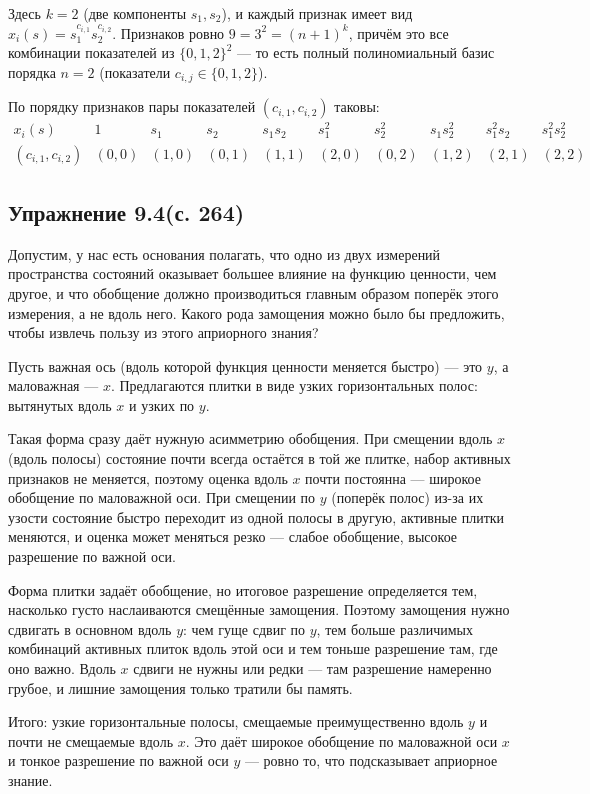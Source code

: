 \begin{solution}
    Здесь $k=2$ (две компоненты $s_1, s_2$), и каждый признак имеет вид
    $x_i(s) = s_1^{c_{i,1}} s_2^{c_{i,2}}$. Признаков ровно $9 = 3^2 = (n+1)^k$,
    причём это все комбинации показателей из $\{0,1,2\}^2$ --- то есть полный
    полиномиальный базис порядка $n=2$ (показатели $c_{i,j} \in \{0,1,2\}$).

    По порядку признаков пары показателей $(c_{i,1}, c_{i,2})$ таковы:
    \begin{equation*}
        \begin{array}{c|ccccccccc}
            x_i(s) & 1 & s_1 & s_2 & s_1 s_2 & s_1^2 & s_2^2 & s_1 s_2^2 & s_1^2 s_2 & s_1^2 s_2^2 \\
            \hline
            (c_{i,1}, c_{i,2}) & (0,0) & (1,0) & (0,1) & (1,1) & (2,0) & (0,2) & (1,2) & (2,1) & (2,2)
        \end{array}
    \end{equation*}
\end{solution}

\subsection{Упражнение 9.4(с. 264)}
Допустим, у нас есть основания полагать, что одно из двух измерений пространства состояний оказывает большее влияние на функцию ценности, чем другое, и что обобщение должно производиться главным образом поперёк этого измерения, а не вдоль него. Какого рода замощения можно было бы предложить, чтобы извлечь пользу из этого априорного знания?

\begin{solution}
    Пусть важная ось (вдоль которой функция ценности меняется быстро) --- это
    $y$, а маловажная --- $x$. Предлагаются плитки в виде узких горизонтальных
    полос: вытянутых вдоль $x$ и узких по $y$.

    Такая форма сразу даёт нужную асимметрию обобщения. При смещении вдоль $x$
    (вдоль полосы) состояние почти всегда остаётся в той же плитке, набор
    активных признаков не меняется, поэтому оценка вдоль $x$ почти постоянна ---
    широкое обобщение по маловажной оси. При смещении по $y$ (поперёк полос)
    из-за их узости состояние быстро переходит из одной полосы в другую, активные
    плитки меняются, и оценка может меняться резко --- слабое обобщение, высокое
    разрешение по важной оси.

    Форма плитки задаёт обобщение, но итоговое разрешение определяется тем,
    насколько густо наслаиваются смещённые замощения. Поэтому замощения нужно
    сдвигать в основном вдоль $y$: чем гуще сдвиг по $y$, тем больше различимых
    комбинаций активных плиток вдоль этой оси и тем тоньше разрешение там, где оно
    важно. Вдоль $x$ сдвиги не нужны или редки --- там разрешение намеренно грубое,
    и лишние замощения только тратили бы память.

    Итого: узкие горизонтальные полосы, смещаемые преимущественно вдоль $y$ и
    почти не смещаемые вдоль $x$. Это даёт широкое обобщение по маловажной оси $x$
    и тонкое разрешение по важной оси $y$ --- ровно то, что подсказывает априорное
    знание.
\end{solution}

